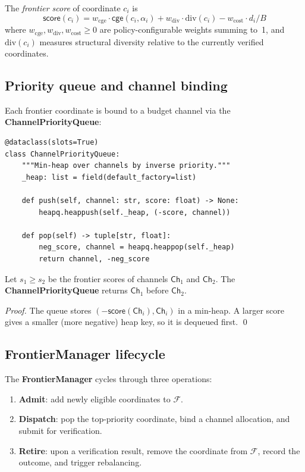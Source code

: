 \documentclass[11pt]{article}
\providecommand{\Chan}{\mathsf{Ch}}            %
\providecommand{\Alloc}{\alpha}                %
\providecommand{\Fron}{\mathcal{F}}            %
\providecommand{\Sco}{\mathsf{score}}          %
\begin{document}
\begin{definition}\label{def:fscore}
The \emph{frontier score} of coordinate $c_i$ is
\[
  \Sco(c_i) =
  w_{\mathrm{cge}} \cdot \mathsf{cge}(c_i, \Alloc_i)
  + w_{\mathrm{div}} \cdot \mathrm{div}(c_i)
  - w_{\mathrm{cost}} \cdot d_i / B
\]
where $w_{\mathrm{cge}}, w_{\mathrm{div}}, w_{\mathrm{cost}} \ge 0$
are policy-configurable weights summing to~1, and
$\mathrm{div}(c_i)$ measures structural diversity relative to the
currently verified coordinates.
\end{definition}

\subsection{Priority queue and channel binding}

Each frontier coordinate is bound to a budget channel via the
\textbf{ChannelPriorityQueue}:

\begin{lstlisting}[style=jugeo-python]
@dataclass(slots=True)
class ChannelPriorityQueue:
    """Min-heap over channels by inverse priority."""
    _heap: list = field(default_factory=list)

    def push(self, channel: str, score: float) -> None:
        heapq.heappush(self._heap, (-score, channel))

    def pop(self) -> tuple[str, float]:
        neg_score, channel = heapq.heappop(self._heap)
        return channel, -neg_score
\end{lstlisting}

\begin{proposition}\label{prop:priority-mono}
Let $s_1 \ge s_2$ be the frontier scores of channels $\Chan_1$
and $\Chan_2$.  The \textbf{ChannelPriorityQueue} returns
$\Chan_1$ before $\Chan_2$.
\end{proposition}

\begin{proof}
The queue stores $(-\Sco(\Chan_i), \Chan_i)$ in a min-heap.
A larger score gives a smaller (more negative) heap key, so
it is dequeued first. \qed
\end{proof}

\subsection{FrontierManager lifecycle}

The \textbf{FrontierManager} cycles through three operations:
\begin{enumerate}
  \item \textbf{Admit}: add newly eligible coordinates to $\Fron$.
  \item \textbf{Dispatch}: pop the top-priority coordinate, bind a
    channel allocation, and submit for verification.
  \item \textbf{Retire}: upon a verification result, remove the
    coordinate from $\Fron$, record the outcome, and trigger
    rebalancing.
\end{enumerate}
\end{document}
